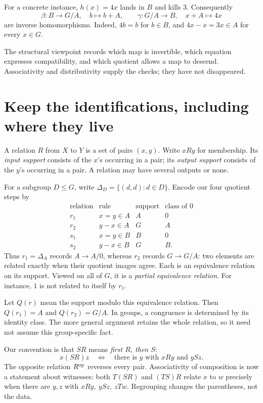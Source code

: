 For a concrete instance, \(h(x)=4x\) lands in \(B\) and kills \(3\).
Consequently
\[
 \beta:B\longrightarrow G/A,\quad b\longmapsto b+A,
 \qquad
 \gamma:G/A\longrightarrow B,\quad x+A\longmapsto4x
\]
are inverse homomorphisms. Indeed, \(4b=b\) for \(b\in B\), and
\(4x-x=3x\in A\) for every \(x\in G\).

The structural viewpoint records which map is invertible, which equation
expresses compatibility, and which quotient allows a map to descend.
Associativity and distributivity supply the checks; they have not disappeared.

\clearpage
\section{Keep the identifications, including where they live}\label{c:relations}
A relation \(R\) from \(X\) to \(Y\) is a set of pairs \((x,y)\).
Write \(xRy\) for membership. Its \emph{input support} consists of the
\(x\)'s occurring in a pair; its \emph{output support} consists of the
\(y\)'s occurring in a pair. A relation may have several outputs or none.

For a subgroup \(D\leq G\), write
\(\Delta_D=\{(d,d):d\in D\}\). Encode our four quotient steps by
\[
\begin{array}{c|l|c|c}
 \text{relation}&\text{rule}&\text{support}&\text{class of }0\\ \hline
 r_1&x=y\in A&A&0\\
 r_2&y-x\in A&G&A\\
 s_1&x=y\in B&B&0\\
 s_2&y-x\in B&G&B .
\end{array}
\]
Thus \(r_1=\Delta_A\) records \(A\to A/0\), whereas \(r_2\) records
\(G\to G/A\): two elements are related exactly when their quotient images
agree. Each is an equivalence relation on its support. Viewed on all of
\(G\), it is a \emph{partial equivalence relation}. For instance,
\(1\) is not related to itself by \(r_1\).

Let \(Q(r)\) mean the support modulo this equivalence relation. Then
\(Q(r_1)=A\) and \(Q(r_2)=G/A\). In groups, a congruence is determined
by its identity class. The more general argument retains the whole relation,
so it need not assume this group-specific fact.

Our convention is that \(SR\) means \emph{first \(R\), then \(S\)}:
\[
 x(SR)z\quad\Longleftrightarrow\quad
 \text{there is }y\text{ with }xRy\text{ and }ySz.
\]
The opposite relation \(R^{\mathrm{op}}\) reverses every pair. Associativity of
composition is now a statement about witnesses: both \(T(SR)\) and
\((TS)R\) relate \(x\) to \(w\) precisely when there are \(y,z\) with
\(xRy,\ ySz,\ zTw\). Regrouping changes the parentheses, not the data.

